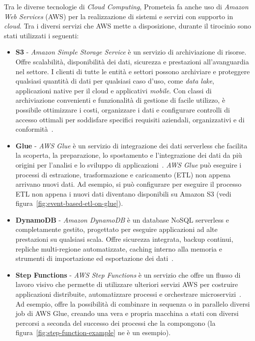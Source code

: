 Tra le diverse tecnologie di \textit{Cloud Computing}, Prometeia fa anche uso di \textit{Amazon Web Services} (AWS) per la realizzazione di sistemi e servizi con supporto in \textit{cloud}.
Tra i diversi servizi che AWS mette a disposizione, durante il tirocinio sono stati utilizzati i seguenti:
\begin{itemize}
    \item \textbf{S3} - \textit{Amazon Simple Storage Service} è un servizio di archiviazione di risorse.
    Offre scalabilità, disponibilità dei dati, sicurezza e prestazioni all'avanguardia nel settore.
    I clienti di tutte le entità e settori possono archiviare e proteggere qualsiasi quantità di dati per qualsiasi caso d'uso, come \textit{data lake}, applicazioni native per il cloud e applicativi \textit{mobile}.
    Con classi di archiviazione convenienti e funzionalità di gestione di facile utilizzo, è possibile ottimizzare i costi, organizzare i dati e configurare controlli di accesso ottimali per soddisfare specifici requisiti aziendali, organizzativi e di conformità~\cite{aws-s3}.
    \item \textbf{Glue} - \textit{AWS Glue} è un servizio di integrazione dei dati serverless che facilita la scoperta, la preparazione, lo spostamento e l'integrazione dei dati da più origini per l'analisi e lo sviluppo di applicazioni~\cite{aws-glue}.
    \textit{AWS Glue} può eseguire i processi di estrazione, trasformazione e caricamento (ETL) non appena arrivano nuovi dati.
    Ad esempio, si può configurare per eseguire il processo ETL non appena i nuovi dati diventano disponibili su Amazon S3 (vedi figura~\ref{fig:event-based-etl-on-glue}).
    \item \textbf{DynamoDB} - \textit{Amazon DynamoDB} è un database NoSQL serverless e completamente gestito, progettato per eseguire applicazioni ad alte prestazioni su qualsiasi scala.
    Offre sicurezza integrata, backup continui, repliche multi-regione automatizzate, caching interno alla memoria e strumenti di importazione ed esportazione dei dati~\cite{aws-dynamo}.
    \item \textbf{Step Functions} - \textit{AWS Step Functions} è un servizio che offre un flusso di lavoro visivo che permette di utilizzare ulteriori servizi AWS per costruire applicazioni distribuite, automatizzare processi e orchestrare microservizi~\cite{aws-step}.
    Ad esempio, offre la possibilità di combinare in sequenza o in parallelo diversi job di AWS Glue, creando una vera e propria macchina a stati con diversi percorsi a seconda del successo dei processi che la compongono (la figura~\ref{fig:step-function-example} ne è un esempio).

\end{itemize}
